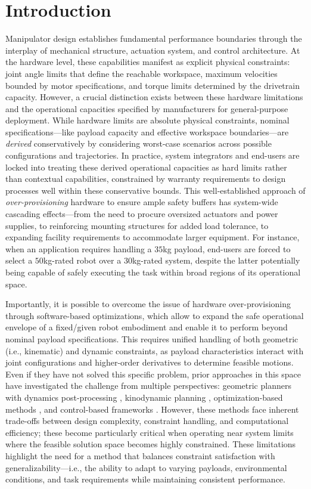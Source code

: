 \section{Introduction}

Manipulator design establishes fundamental performance boundaries through the interplay of mechanical structure, actuation system, and control architecture.
At the hardware level, these capabilities manifest as explicit physical constraints: joint angle limits that define the reachable workspace, maximum velocities bounded by motor specifications, and torque limits determined by the drivetrain capacity.
However, a crucial distinction exists between these hardware limitations and the operational capacities specified by manufacturers for general-purpose deployment.
While hardware limits are absolute physical constraints, nominal specifications---like payload capacity and effective workspace boundaries---are \textit{derived} conservatively by considering worst-case scenarios across possible configurations and trajectories.
In practice, system integrators and end-users are locked into treating these derived operational capacities as hard limits rather than contextual capabilities, constrained by warranty requirements to design processes well within these conservative bounds.
This well-established approach of \textit{over-provisioning} hardware to ensure ample safety buffers has system-wide cascading effects---from the need to procure oversized actuators and power supplies, to reinforcing mounting structures for added load tolerance, to expanding facility requirements to accommodate larger equipment.
For instance, when an application requires handling a $35$kg payload, end-users are forced to select a $50$kg-rated robot over a $30$kg-rated system, despite the latter potentially being capable of safely executing the task within broad regions of its operational space.

Importantly, it is possible to overcome the issue of hardware over-provisioning through software-based optimizations, which allow to expand the safe operational envelope of a fixed/given robot embodiment and enable it to perform beyond nominal payload specifications.
This requires unified handling of both geometric (i.e., kinematic) and dynamic constraints, as payload characteristics interact with joint configurations and higher-order derivatives to determine feasible motions.
Even if they have not solved this specific problem, prior approaches in this space have investigated the challenge from multiple perspectives: geometric planners with dynamics post-processing \cite{orthey2023sampling,berscheid2021jerk}, kinodynamic planning \cite{shome2021asymptotically}, optimization-based methods \cite{ichnowski2022gomp}, and control-based frameworks \cite{arrizabalaga2024slosh}. However, these methods face inherent trade-offs between design complexity, constraint handling, and computational efficiency; these become particularly critical when operating near system limits where the feasible solution space becomes highly constrained.
These limitations highlight the need for a method that balances constraint satisfaction with
generalizability---i.e., the ability to adapt to varying payloads, environmental conditions, and task requirements while maintaining consistent performance.

